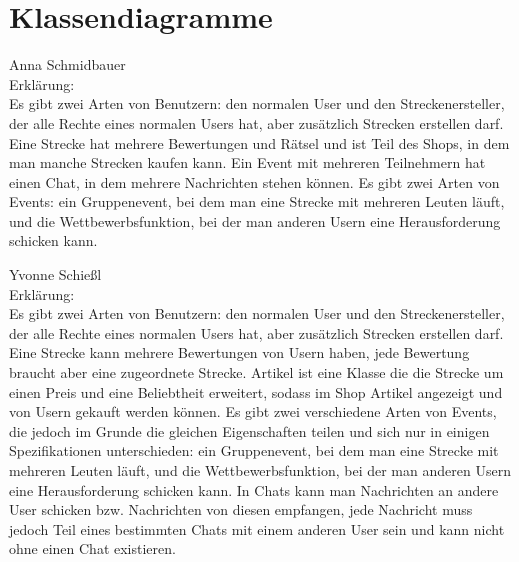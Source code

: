 \documentclass[a4paper, 12pt]{article}
\begin{document}
\section{Klassendiagramme}


\begin{figure}[H] 
\centering
	\fbox{\begin{minipage}{16cm} 
	\end{minipage}}
\end{figure}
Anna Schmidbauer\\
Erklärung:\\
Es gibt zwei Arten von Benutzern: den normalen User und den Streckenersteller, der alle Rechte eines normalen Users hat, aber zusätzlich Strecken erstellen darf. Eine Strecke hat mehrere Bewertungen und Rätsel und ist Teil des Shops, in dem man manche Strecken kaufen kann. Ein Event mit mehreren Teilnehmern hat einen Chat, in dem mehrere Nachrichten stehen können. Es gibt zwei Arten von Events: ein Gruppenevent, bei dem man eine Strecke mit mehreren Leuten läuft, und die Wettbewerbsfunktion, bei der man anderen Usern eine Herausforderung schicken kann.\\

\begin{figure}[H] 
\centering
	\fbox{\begin{minipage}{16cm} 
	\end{minipage}}
\end{figure}
Yvonne Schießl\\
Erklärung:\\
Es gibt zwei Arten von Benutzern: den normalen User und den Streckenersteller, der alle Rechte eines normalen Users hat, aber zusätzlich Strecken erstellen darf. Eine Strecke kann mehrere Bewertungen von Usern haben, jede Bewertung braucht aber eine zugeordnete Strecke. Artikel ist eine Klasse die die Strecke um einen Preis und eine Beliebtheit erweitert, sodass im Shop Artikel angezeigt und von Usern gekauft werden können. Es gibt zwei verschiedene Arten von Events, die jedoch im Grunde die gleichen Eigenschaften teilen und sich nur in einigen Spezifikationen unterschieden: ein Gruppenevent, bei dem man eine Strecke mit mehreren Leuten läuft, und die Wettbewerbsfunktion, bei der man anderen Usern eine Herausforderung schicken kann. In Chats kann man Nachrichten an andere User schicken bzw. Nachrichten von diesen empfangen, jede Nachricht muss jedoch Teil eines bestimmten Chats mit einem anderen User sein und kann nicht ohne einen Chat existieren.\\
\end{document}
